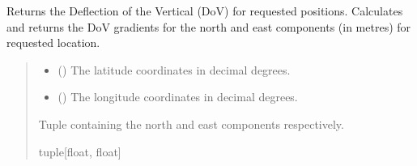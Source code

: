 \documentclass[letterpaper,10pt,english]{sphinxmanual}
\begin{document}
\begin{fulllineitems}
\begin{fulllineitems}
\label{\detokenize{modules/earth/geoid:qnav.earth.geoid.GeoidModel.get_dov_vec}}
\pysigstartsignatures
{}
\pysigstopsignatures
\sphinxAtStartPar
Returns the Deflection of the Vertical (DoV) for requested positions.
Calculates and returns the DoV gradients for the north and east
components (in metres) for requested location.
\begin{quote}\begin{description}
\begin{itemize}
\item {} 
\sphinxAtStartPar
{} () \textendash{} The latitude coordinates in decimal degrees.

\item {} 
\sphinxAtStartPar
{} () \textendash{} The longitude coordinates in decimal degrees.

\end{itemize}

\sphinxAtStartPar
Tuple containing the north and east components respectively.

\sphinxAtStartPar
tuple{[}float, float{]}

\end{description}\end{quote}

\end{fulllineitems}


\end{fulllineitems}

\end{document}
